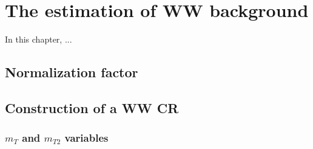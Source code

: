 \chapter{The estimation of WW background} \label{EstWW:Main}

In this chapter, ...

\section{Normalization factor}\label{EstWW:intro}


\section{Construction of a WW CR}\label{EstWW:construction}



\subsection{$m_{T}$ and $m_{T2}$ variables}\label{EstWW:mtmt2}
